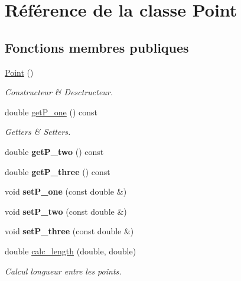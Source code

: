 \hypertarget{class_point}{\section{Référence de la classe Point}
\label{class_point}
}
\subsection*{Fonctions membres publiques}
\begin{DoxyCompactItemize}
\item 
\hyperlink{class_point_ad92f2337b839a94ce97dcdb439b4325a}{Point} ()
\begin{DoxyCompactList}\small\item\em Constructeur \& Desctructeur. \end{DoxyCompactList}\item 
double \hyperlink{class_point_a211f8dee098122a2f1c326ba42652ee2}{get\-P\-\_\-one} () const 
\begin{DoxyCompactList}\small\item\em Getters \& Setters. \end{DoxyCompactList}\item 
\hypertarget{class_point_afd9ee8dca2913903fd6a1a95d743afaa}{double {\bfseries get\-P\-\_\-two} () const }\label{class_point_afd9ee8dca2913903fd6a1a95d743afaa}

\item 
\hypertarget{class_point_adf0f89d9beca24315b45d96786896a56}{double {\bfseries get\-P\-\_\-three} () const }\label{class_point_adf0f89d9beca24315b45d96786896a56}

\item 
\hypertarget{class_point_aea96dfedc04450f20928929fc1357ba6}{void {\bfseries set\-P\-\_\-one} (const double \&)}\label{class_point_aea96dfedc04450f20928929fc1357ba6}

\item 
\hypertarget{class_point_a282784b2c6669e5270b9ec447f6e9dc1}{void {\bfseries set\-P\-\_\-two} (const double \&)}\label{class_point_a282784b2c6669e5270b9ec447f6e9dc1}

\item 
\hypertarget{class_point_aa46638c8c613fa6192272d4a4168f503}{void {\bfseries set\-P\-\_\-three} (const double \&)}\label{class_point_aa46638c8c613fa6192272d4a4168f503}

\item 
double \hyperlink{class_point_a5cb059b4e16aca7ca375076971d90521}{calc\-\_\-length} (double, double)
\begin{DoxyCompactList}\small\item\em Calcul longueur entre les points. \end{DoxyCompactList}\end{DoxyCompactItemize}



